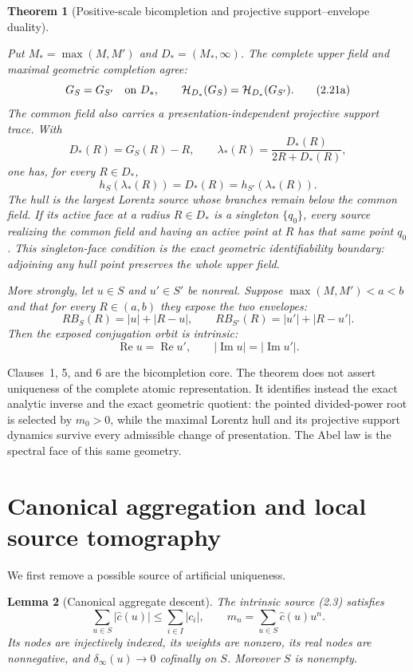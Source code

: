 \documentclass[11pt]{article}
\newtheorem{theorem}{Theorem}[section]
\newtheorem{lemma}[theorem]{Lemma}
\theoremstyle{remark}
\newcommand{\Rea}{\operatorname{Re}}
\newcommand{\Ima}{\operatorname{Im}}
\begin{document}
\begin{theorem}[Positive-scale bicompletion and projective support--envelope duality]
\begin{enumerate}
Put $M_*=\max(M,M')$ and $D_*=(M_*,\infty)$.  The complete upper field and maximal geometric
completion agree:
\begin{equation}
 G_S=G_{S'}\quad\hbox{on }D_*,
 \qquad
 \mathcal H_{D_*}(G_S)=\mathcal H_{D_*}(G_{S'}).
 \tag{2.21a}
\end{equation}
The common field also carries a presentation-independent projective support trace.  With
\[
 D_*(R)=G_S(R)-R,
 \qquad \lambda_*(R)=\frac{D_*(R)}{2R+D_*(R)},
\]
one has, for every $R\in D_*$,
\begin{equation}
 h_S(\lambda_*(R))=D_*(R)=h_{S'}(\lambda_*(R)).
 \tag{2.21b}
\end{equation}
The hull is the largest Lorentz source whose branches remain below the common field.  If its
active face at a radius $R\in D_*$ is a singleton $\{q_0\}$, every source realizing the common
field and having an active point at $R$ has that same point $q_0$.  This singleton-face condition
is the exact geometric identifiability boundary: adjoining any hull point preserves the whole
upper field.

More strongly, let $u\in S$ and $u'\in S'$ be nonreal.  Suppose
$\max(M,M')<a<b$ and that for every $R\in(a,b)$ they expose the two envelopes:
\[
 RB_S(R)=|u|+|R-u|,
 \qquad RB_{S'}(R)=|u'|+|R-u'|.
\]
Then the exposed conjugation orbit is intrinsic:
\begin{equation}
 \Rea u=\Rea u',\qquad |\Ima u|=|\Ima u'|.
 \tag{2.22}
\end{equation}
\end{enumerate}
\end{theorem}

Clauses~1, 5, and 6 are the bicompletion core.  The theorem does not assert uniqueness of the
complete atomic representation.  It identifies instead the exact analytic inverse and the exact
geometric quotient: the pointed divided-power root is selected by $m_0>0$, while the maximal
Lorentz hull and its projective support dynamics survive every admissible change of presentation.
The Abel law is the spectral face of this same geometry.

\section{Canonical aggregation and local source tomography}
\label{sec:aggregation}

We first remove a possible source of artificial uniqueness.

\begin{lemma}[Canonical aggregate descent]
\label{lem:aggregate}
The intrinsic source \emph{(2.3)} satisfies
\[
 \sum_{u\in S}|\widehat c(u)|\le\sum_{i\in I}|c_i|,
 \qquad
 m_n=\sum_{u\in S}\widehat c(u)u^n.
\]
Its nodes are injectively indexed, its weights are nonzero, its real nodes are nonnegative, and
$\delta_\infty(u)\to0$ cofinally on $S$.  Moreover $S$ is nonempty.
\end{lemma}
\end{document}
